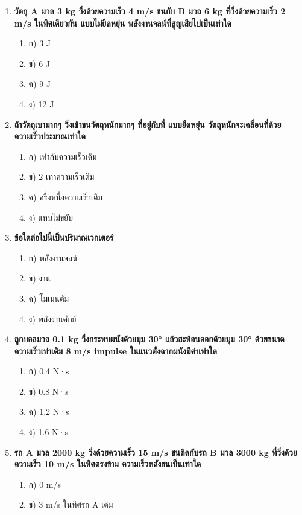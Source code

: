 \documentclass[12pt]{article}
\begin{document}
\begin{enumerate}
\begin{enumerate}
\item ค) พลังงานจลน์คงที่
\item ง) พลังงานศักย์คงที่
\end{enumerate}
\item \textbf{วัตถุ A มวล 3 kg วิ่งด้วยความเร็ว 4 m/s ชนกับ B มวล 6 kg ที่วิ่งด้วยความเร็ว 2 m/s ในทิศเดียวกัน แบบไม่ยืดหยุ่น พลังงานจลน์ที่สูญเสียไปเป็นเท่าใด}
\begin{enumerate}
\item ก) 3 J
\item ข) 6 J
\item ค) 9 J
\item ง) 12 J
\end{enumerate}
\item \textbf{ถ้าวัตถุเบามากๆ วิ่งเข้าชนวัตถุหนักมากๆ ที่อยู่กับที่ แบบยืดหยุ่น วัตถุหนักจะเคลื่อนที่ด้วยความเร็วประมาณเท่าใด}
\begin{enumerate}
\item ก) เท่ากับความเร็วเดิม
\item ข) 2 เท่าความเร็วเดิม
\item ค) ครึ่งหนึ่งความเร็วเดิม
\item ง) แทบไม่ขยับ
\end{enumerate}
\item \textbf{ข้อใดต่อไปนี้เป็นปริมาณเวกเตอร์}
\begin{enumerate}
\item ก) พลังงานจลน์
\item ข) งาน
\item ค) โมเมนตัม
\item ง) พลังงานศักย์
\end{enumerate}
\item \textbf{ลูกบอลมวล 0.1 kg วิ่งกระทบผนังด้วยมุม 30° แล้วสะท้อนออกด้วยมุม 30° ด้วยขนาดความเร็วเท่าเดิม 8 m/s impulse ในแนวตั้งฉากผนังมีค่าเท่าใด}
\begin{enumerate}
\item ก) 0.4 N·s
\item ข) 0.8 N·s
\item ค) 1.2 N·s
\item ง) 1.6 N·s
\end{enumerate}
\item \textbf{รถ A มวล 2000 kg วิ่งด้วยความเร็ว 15 m/s ชนติดกับรถ B มวล 3000 kg ที่วิ่งด้วยความเร็ว 10 m/s ในทิศตรงข้าม ความเร็วหลังชนเป็นเท่าใด}
\begin{enumerate}
\item ก) 0 m/s
\item ข) 3 m/s ในทิศรถ A เดิม

\end{enumerate}
\end{enumerate}
\end{document}
